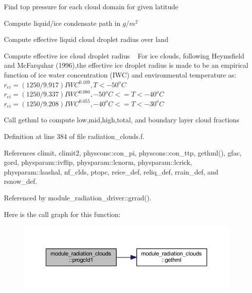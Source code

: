 \begin{DoxyEnumerate}
\item Find top pressure for each cloud domain for given latitude
\item Compute liquid/ice condensate path in $ g/m^2 $
\item Compute effective liquid cloud droplet radius over land
\item Compute effective ice cloud droplet radius ~\newline
 For ice clouds, following Heymsfield and Mc\+Farquhar (1996),the effective ice droplet radius is made to be an empirical function of ice water concentration (I\+WC) and environmental temperature as\+: ~\newline
 $ r_{ei} = (1250/9.917)IWC^{0.109},T<-50^oC $ ~\newline
 $ r_{ei} = (1250/9.337)IWC^{0.080},-50^oC<=T<-40^oC $ ~\newline
 $ r_{ei} = (1250/9.208)IWC^{0.055},-40^oC<=T<-30^oC $ ~\newline

\item Call gethml to compute low,mid,high,total, and boundary layer cloud fractions 
\end{DoxyEnumerate}

Definition at line 384 of file radiation\+\_\+clouds.\+f.



References climit, climit2, physcons\+::con\+\_\+pi, physcons\+::con\+\_\+ttp, gethml(), gfac, gord, physparam\+::ivflip, physparam\+::lcnorm, physparam\+::lcrick, physparam\+::lsashal, nf\+\_\+clds, ptopc, reice\+\_\+def, reliq\+\_\+def, rrain\+\_\+def, and rsnow\+\_\+def.



Referenced by module\+\_\+radiation\+\_\+driver\+::grrad().



Here is the call graph for this function\+:\nopagebreak
\begin{figure}[H]
\begin{center}
\leavevmode
\includegraphics[width=350pt]{namespacemodule__radiation__clouds_ab45374e1eeec7d6211284b38c3ec8448_cgraph}
\end{center}
\end{figure}





